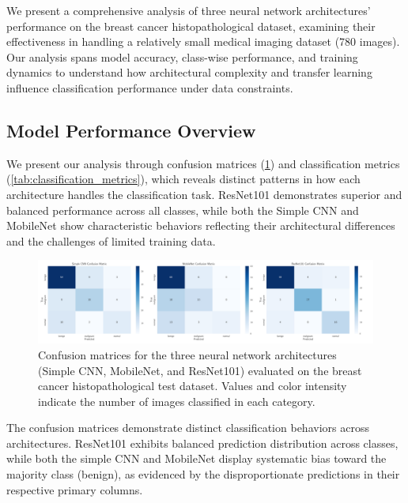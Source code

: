 
We present a comprehensive analysis of three neural network architectures' performance on the breast cancer histopathological dataset, examining their effectiveness in handling a relatively small medical imaging dataset (780 images). Our analysis spans model accuracy, class-wise performance, and training dynamics to understand how architectural complexity and transfer learning influence classification performance under data constraints.

\subsection{Model Performance Overview}

We present our analysis through confusion matrices (\cref{fig:confusion_matrix}) and classification metrics (\cref{tab:classification_metrics}), which reveals distinct patterns in how each architecture handles the classification task. ResNet101 demonstrates superior and balanced performance across all classes, while both the Simple CNN and MobileNet show characteristic behaviors reflecting their architectural differences and the challenges of limited training data.

\onecolumngrid
\begin{figure}[h!]
    \begin{minipage}{\textwidth}
        \centering
        \includegraphics[width = .9\textwidth]{../figs/confusion_matrices.pdf}
        \caption{Confusion matrices for the three neural network architectures (Simple CNN, MobileNet, and ResNet101) evaluated on the breast cancer histopathological test dataset. Values and color intensity indicate the number of images classified in each category.}
        \label{fig:confusion_matrix}
    \end{minipage}
\end{figure}
\twocolumngrid

The confusion matrices demonstrate distinct classification behaviors across architectures. ResNet101 exhibits balanced prediction distribution across classes, while both the simple CNN and MobileNet display systematic bias toward the majority class (benign), as evidenced by the disproportionate predictions in their respective primary columns.


